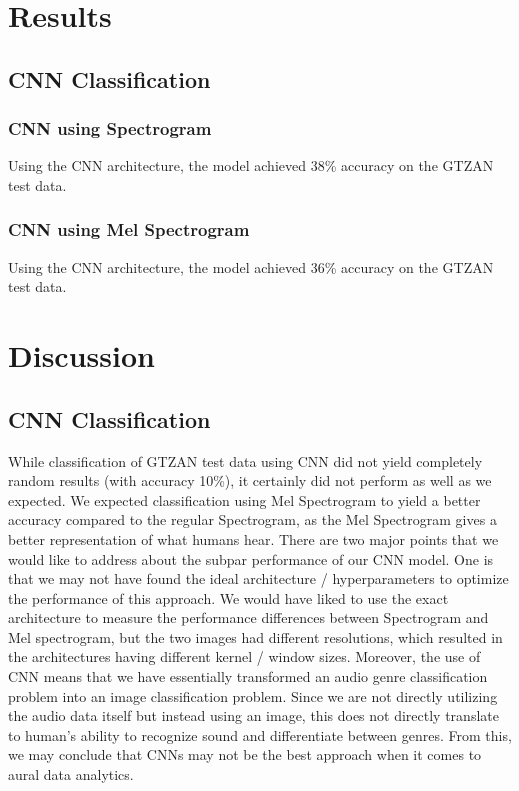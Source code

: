\documentclass{article}
\theoremstyle{plain}
\theoremstyle{definition}
\theoremstyle{remark}
\begin{document}
\section{Results}

\subsection{CNN Classification}

\subsubsection{CNN using Spectrogram}
Using the CNN architecture, the model achieved 38\% accuracy on the GTZAN test data.

\subsubsection{CNN using Mel Spectrogram}
Using the CNN architecture, the model achieved 36\% accuracy on the GTZAN test data.

\section{Discussion}

\subsection{CNN Classification}
While classification of GTZAN test data using CNN did not yield completely random results (with accuracy 10\%), it certainly did not perform as well as we expected. We expected classification using Mel Spectrogram to yield a better accuracy compared to the regular Spectrogram, as the Mel Spectrogram gives a better representation of what humans hear. There are two major points that we would like to address about the subpar performance of our CNN model. One is that we may not have found the ideal architecture / hyperparameters to optimize the performance of this approach. We would have liked to use the exact architecture to measure the performance differences between Spectrogram and Mel spectrogram, but the two images had different resolutions, which resulted in the architectures having different kernel / window sizes. Moreover, the use of CNN means that we have essentially transformed an audio genre classification problem into an image classification problem. Since we are not directly utilizing the audio data itself but instead using an image, this does not directly translate to human's ability to recognize sound and differentiate between genres. From this, we may conclude that CNNs may not be the best approach when it comes to aural data analytics.
\end{document}
